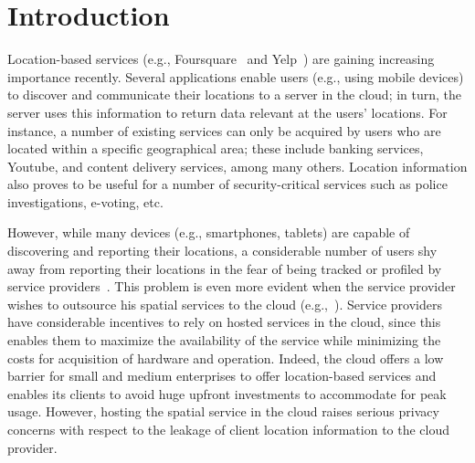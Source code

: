 \documentclass{llncs}
\begin{document}
\section{Introduction}

Location-based services (e.g., Foursquare~\cite{fousquare} and Yelp~\cite{yelp}) are gaining increasing importance recently. Several applications enable users (e.g., using mobile devices) to discover
and communicate their locations to a server in the cloud; in turn, the
server uses this information to return data relevant at the users' locations. For instance, a number of existing services can only be acquired by users who are located within
a specific geographical area; these include banking services, Youtube, and content delivery services, among many others. Location information also proves to be useful for a number of security-critical services
such as police investigations, e-voting, etc.

However, while many devices (e.g., smartphones, tablets) are capable of discovering and reporting their locations, a considerable number of users shy away
from reporting their locations in the fear of being tracked or profiled by service providers~\cite{Barkhuus03location-basedservices}. This problem is even more evident when the service provider wishes to outsource his spatial services to the cloud (e.g.,~\cite{valtus}).
Service providers have considerable incentives to rely on hosted services in the cloud, since this enables them to maximize the availability of the service while minimizing the costs for acquisition of hardware and operation. Indeed, the cloud offers a low barrier for small and medium enterprises to offer location-based services and enables its clients to avoid huge upfront investments to accommodate for peak usage. However, hosting the spatial service in the cloud raises serious privacy concerns with respect to the leakage of client location information to the cloud provider.
\end{document}
